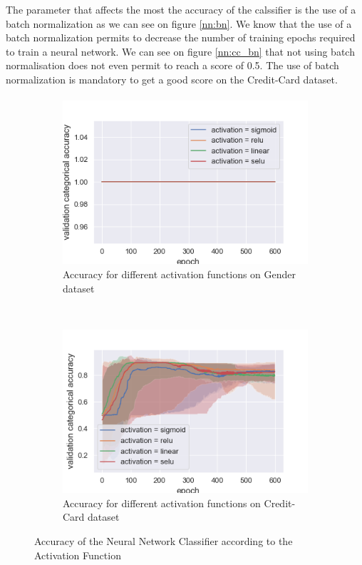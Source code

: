 \documentclass[10pt]{article}
\begin{document}
			The parameter that affects the most the accuracy of the calssifier is the use of a batch normalization as we can see on figure \ref{nn:bn}. We know that the use of a batch normalization permits to decrease the number of training epochs required to train a neural network. We can see on figure \ref{nn:cc_bn} that not using batch normalisation does not even permit to reach a score of 0.5. The use of batch normalization is mandatory to get a good score on the Credit-Card dataset.
		\paragraph*{}
			\begin{figure}[h]
				\centering
				\begin{subfigure}[]{0.45\columnwidth}
					\centering
					\includegraphics[width=\linewidth]{../graphics/per_gender_epoch_score_type_activation.png}
					\caption{Accuracy for different activation functions on Gender dataset}
					\label{nn:g_act}
				\end{subfigure}
				~
				\begin{subfigure}[]{0.45\columnwidth}
					\centering
					\includegraphics[width=\linewidth]{../graphics/per_creditcard_epoch_score_type_activation.png}
					\caption{Accuracy for different activation functions on Credit-Card dataset}
					\label{nn:cc_act}
				\end{subfigure}
				\caption{Accuracy of the Neural Network Classifier according to the Activation Function}
				\label{nn:activation}
			\end{figure}
\end{document}

